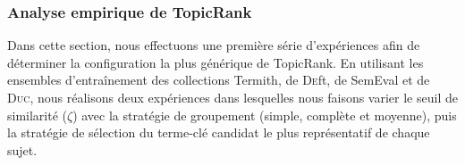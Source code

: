      \subsubsection{Analyse empirique de TopicRank}
      \label{subsubsec:main:domain_independent_keyphrase_extraction-unsupervised_automatic_keyphrase_extraction-evaluation-empirical_analysis_of_topicrank}
        Dans cette section, nous effectuons une première série d'expériences
        afin de déterminer la configuration la plus générique de
        TopicRank. En utilisant les ensembles d'entraînement des collections
        Termith, de \textsc{De}ft, de SemEval et de \textsc{Duc}, nous réalisons
        deux expériences dans lesquelles nous faisons varier le seuil de
        similarité ($\zeta$) avec la stratégie de groupement (simple, complète
        et moyenne), puis la stratégie de sélection du terme-clé candidat le
        plus représentatif de chaque sujet.
